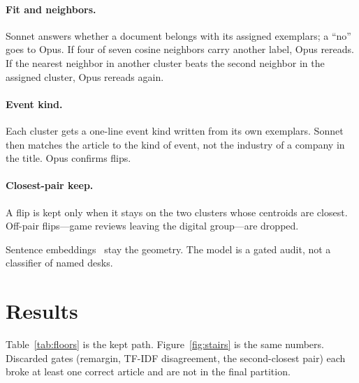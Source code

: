\documentclass[acmlarge,screen]{acmart}
\begin{document}
\paragraph{Fit and neighbors.}
Sonnet answers whether a document belongs with its assigned exemplars; a ``no'' goes to Opus. If four of seven cosine neighbors carry another label, Opus rereads. If the nearest neighbor in another cluster beats the second neighbor in the assigned cluster, Opus rereads again.

\paragraph{Event kind.}
Each cluster gets a one-line event kind written from its own exemplars. Sonnet then matches the article to the kind of event, not the industry of a company in the title. Opus confirms flips.

\paragraph{Closest-pair keep.}
A flip is kept only when it stays on the two clusters whose centroids are closest. Off-pair flips---game reviews leaving the digital group---are dropped.

Sentence embeddings~\cite{reimers2019sbert} stay the geometry. The model is a gated audit, not a classifier of named desks.

\section{Results}

Table~\ref{tab:floors} is the kept path. Figure~\ref{fig:stairs} is the same numbers. Discarded gates (remargin, TF-IDF disagreement, the second-closest pair) each broke at least one correct article and are not in the final partition.
\end{document}
